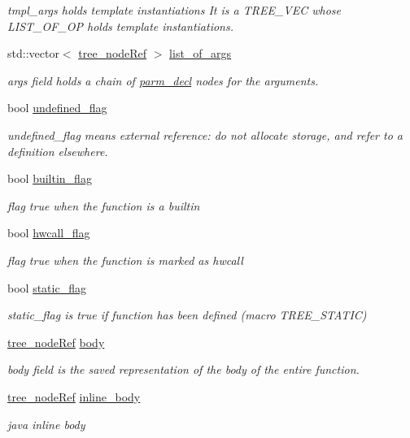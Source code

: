 \begin{DoxyCompactItemize}
\begin{DoxyCompactList}\small\item\em tmpl\+\_\+args holds template instantiations It is a T\+R\+E\+E\+\_\+\+V\+EC whose L\+I\+S\+T\+\_\+\+O\+F\+\_\+\+OP holds template instantiations. \end{DoxyCompactList}\item 
std\+::vector$<$ \hyperlink{tree__node_8hpp_a6ee377554d1c4871ad66a337eaa67fd5}{tree\+\_\+node\+Ref} $>$ \hyperlink{structfunction__decl_ac3aaffaf5fea1c05d4c4896315eae082}{list\+\_\+of\+\_\+args}
\begin{DoxyCompactList}\small\item\em args field holds a chain of \hyperlink{structparm__decl}{parm\+\_\+decl} nodes for the arguments. \end{DoxyCompactList}\item 
bool \hyperlink{structfunction__decl_a049eeab7e558df69c1398cb31e96168c}{undefined\+\_\+flag}
\begin{DoxyCompactList}\small\item\em undefined\+\_\+flag means external reference\+: do not allocate storage, and refer to a definition elsewhere. \end{DoxyCompactList}\item 
bool \hyperlink{structfunction__decl_a275d38da70ab7bafe5ebdd3d65ec4377}{builtin\+\_\+flag}
\begin{DoxyCompactList}\small\item\em flag true when the function is a builtin \end{DoxyCompactList}\item 
bool \hyperlink{structfunction__decl_abfbad4d32959028d666eed9189ae5411}{hwcall\+\_\+flag}
\begin{DoxyCompactList}\small\item\em flag true when the function is marked as hwcall \end{DoxyCompactList}\item 
bool \hyperlink{structfunction__decl_a3faebd1c149b8bb7454c889d15cbb114}{static\+\_\+flag}
\begin{DoxyCompactList}\small\item\em static\+\_\+flag is true if function has been defined (macro T\+R\+E\+E\+\_\+\+S\+T\+A\+T\+IC) \end{DoxyCompactList}\item 
\hyperlink{tree__node_8hpp_a6ee377554d1c4871ad66a337eaa67fd5}{tree\+\_\+node\+Ref} \hyperlink{structfunction__decl_ae505883753148cd4e4c29ad41de7110b}{body}
\begin{DoxyCompactList}\small\item\em body field is the saved representation of the body of the entire function. \end{DoxyCompactList}\item 
\hyperlink{tree__node_8hpp_a6ee377554d1c4871ad66a337eaa67fd5}{tree\+\_\+node\+Ref} \hyperlink{structfunction__decl_afa04f25b4d2937afad322b62f74d6ca5}{inline\+\_\+body}
\begin{DoxyCompactList}\small\item\em java inline body \end{DoxyCompactList}\end{DoxyCompactItemize}
